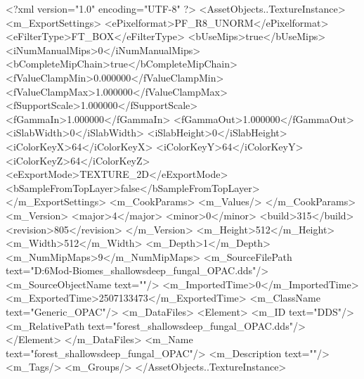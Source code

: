 <?xml version="1.0" encoding="UTF-8" ?>
<AssetObjects..TextureInstance>
	<m_ExportSettings>
		<ePixelformat>PF_R8_UNORM</ePixelformat>
		<eFilterType>FT_BOX</eFilterType>
		<bUseMips>true</bUseMips>
		<iNumManualMips>0</iNumManualMips>
		<bCompleteMipChain>true</bCompleteMipChain>
		<fValueClampMin>0.000000</fValueClampMin>
		<fValueClampMax>1.000000</fValueClampMax>
		<fSupportScale>1.000000</fSupportScale>
		<fGammaIn>1.000000</fGammaIn>
		<fGammaOut>1.000000</fGammaOut>
		<iSlabWidth>0</iSlabWidth>
		<iSlabHeight>0</iSlabHeight>
		<iColorKeyX>64</iColorKeyX>
		<iColorKeyY>64</iColorKeyY>
		<iColorKeyZ>64</iColorKeyZ>
		<eExportMode>TEXTURE_2D</eExportMode>
		<bSampleFromTopLayer>false</bSampleFromTopLayer>
	</m_ExportSettings>
	<m_CookParams>
		<m_Values/>
	</m_CookParams>
	<m_Version>
		<major>4</major>
		<minor>0</minor>
		<build>315</build>
		<revision>805</revision>
	</m_Version>
	<m_Height>512</m_Height>
	<m_Width>512</m_Width>
	<m_Depth>1</m_Depth>
	<m_NumMipMaps>9</m_NumMipMaps>
	<m_SourceFilePath text="D:\Civ6Mod\Terrain\BE-Biomes\Fungal\forest_shallowsdeep_fungal_OPAC.dds"/>
	<m_SourceObjectName text=""/>
	<m_ImportedTime>0</m_ImportedTime>
	<m_ExportedTime>2507133473</m_ExportedTime>
	<m_ClassName text="Generic_OPAC"/>
	<m_DataFiles>
		<Element>
			<m_ID text="DDS"/>
			<m_RelativePath text="forest_shallowsdeep_fungal_OPAC.dds"/>
		</Element>
	</m_DataFiles>
	<m_Name text="forest_shallowsdeep_fungal_OPAC"/>
	<m_Description text=""/>
	<m_Tags/>
	<m_Groups/>
</AssetObjects..TextureInstance>

